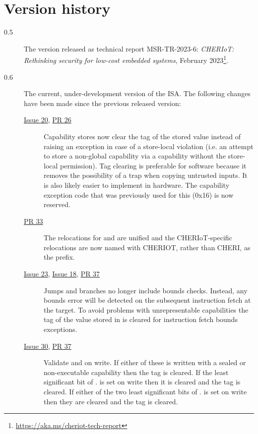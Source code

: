 \newcommand{\ghissue}[1]{\href{https://github.com/microsoft/cheriot-sail/issues/#1}{Issue #1}}
\newcommand{\ghpr}[1]{\href{https://github.com/microsoft/cheriot-sail/pull/#1}{PR #1}}
\chapter{Version history}
\label{chap:changes}

\begin{description}
\item[0.5] The version released as technical report MSR-TR-2023-6: \emph{CHERIoT: Rethinking security for low-cost embedded systems}, February 2023\footnote{\url{https://aka.ms/cheriot-tech-report}}.
\item[0.6] The current, under-development version of the ISA. The following changes have been made since the previous released version:
    \begin{description}
    \item[\ghissue{20}, \ghpr{26}] Capability stores now clear the tag of the stored value instead of raising an exception in case of a store-local violation
    (i.e. an attempt to store a non-global capability via a capability without the store-local permission).
    Tag clearing is preferable for software because it removes the possibility of a trap when copying untrusted inputs.
    It is also likely easier to implement in hardware.
    The capability exception code that was previously used for this (0x16) is now reserved.
    \item[\ghpr{33}] The relocations for  and  are unified and the CHERIoT-specific relocations are now named with CHERIOT, rather than CHERI, as the prefix.
    \item[\ghissue{23}, \ghissue{18}, \ghpr{37}] Jumps and branches no longer include bounds checks.
    Instead, any \PCC{} bounds error will be detected on the subsequent instruction fetch at the target.
    To avoid problems with unrepresentable capabilities the tag of the value stored in \EPCC{} is cleared for instruction fetch bounds exceptions.
    \item[\ghissue{30}, \ghpr{37}] Validate \MEPCC{} and \MTCC{} on write.
    If either of these is written with a sealed or non-executable capability then the tag is cleared.
    If the least significant bit of \MEPCC{}.\caddress{} is set on write then it is cleared and the tag is cleared.
    If either of the two least significant bits of \MTCC{}.\caddress{} is set on write then they are cleared and the tag is cleared.

\end{description}
\end{description}
